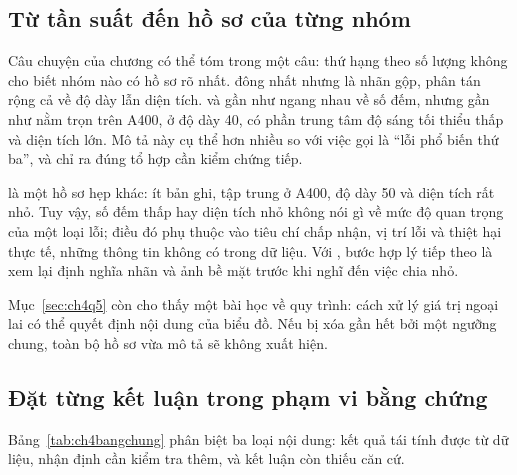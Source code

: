 \subsection{Từ tần suất đến hồ sơ của từng nhóm}

Câu chuyện của chương có thể tóm trong một câu: thứ hạng theo số lượng không cho biết nhóm nào có hồ sơ rõ nhất.  đông nhất nhưng là nhãn gộp, phân tán rộng cả về độ dày lẫn diện tích.  và  gần như ngang nhau về số đếm, nhưng  gần như nằm trọn trên A400, ở độ dày 40, có phần trung tâm độ sáng tối thiểu thấp và diện tích lớn. Mô tả này cụ thể hơn nhiều so với việc gọi  là ``lỗi phổ biến thứ ba'', và chỉ ra đúng tổ hợp cần kiểm chứng tiếp.

 là một hồ sơ hẹp khác: ít bản ghi, tập trung ở A400, độ dày 50 và diện tích rất nhỏ. Tuy vậy, số đếm thấp hay diện tích nhỏ không nói gì về mức độ quan trọng của một loại lỗi; điều đó phụ thuộc vào tiêu chí chấp nhận, vị trí lỗi và thiệt hại thực tế, những thông tin không có trong dữ liệu. Với , bước hợp lý tiếp theo là xem lại định nghĩa nhãn và ảnh bề mặt trước khi nghĩ đến việc chia nhỏ.

Mục~\ref{sec:ch4q5} còn cho thấy một bài học về quy trình: cách xử lý giá trị ngoại lai có thể quyết định nội dung của biểu đồ. Nếu  bị xóa gần hết bởi một ngưỡng chung, toàn bộ hồ sơ vừa mô tả sẽ không xuất hiện.

\subsection{Đặt từng kết luận trong phạm vi bằng chứng}

Bảng~\ref{tab:ch4bangchung} phân biệt ba loại nội dung: kết quả tái tính được từ dữ liệu, nhận định cần kiểm tra thêm, và kết luận còn thiếu căn cứ.

